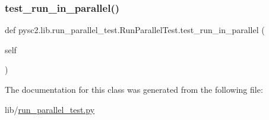 \subsubsection{\texorpdfstring{test\+\_\+run\+\_\+in\+\_\+parallel()}{test\_run\_in\_parallel()}}
{\footnotesize\ttfamily def pysc2.\+lib.\+run\+\_\+parallel\+\_\+test.\+Run\+Parallel\+Test.\+test\+\_\+run\+\_\+in\+\_\+parallel (\begin{DoxyParamCaption}\item[{}]{self }\end{DoxyParamCaption})}



The documentation for this class was generated from the following file\+:\begin{DoxyCompactItemize}
\item 
lib/\mbox{\hyperlink{run__parallel__test_8py}{run\+\_\+parallel\+\_\+test.\+py}}\end{DoxyCompactItemize}
